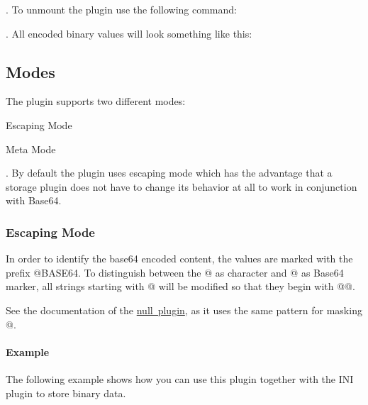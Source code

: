 . To unmount the plugin use the following command\+:


\begin{DoxyCode}{0}
\end{DoxyCode}


. All encoded binary values will look something like this\+:


\begin{DoxyCode}{0}
\end{DoxyCode}
\hypertarget{autotoc_md52_autotoc_md55}{}\subsection{Modes}\label{autotoc_md52_autotoc_md55}
The plugin supports two different modes\+:


\begin{DoxyEnumerate}
\item Escaping Mode
\item Meta Mode
\end{DoxyEnumerate}

. By default the plugin uses escaping mode which has the advantage that a storage plugin does not have to change its behavior at all to work in conjunction with Base64.\hypertarget{autotoc_md52_autotoc_md56}{}\subsubsection{Escaping Mode}\label{autotoc_md52_autotoc_md56}
In order to identify the base64 encoded content, the values are marked with the prefix {\ttfamily @B\+A\+S\+E64}. To distinguish between the {\ttfamily @} as character and {\ttfamily @} as Base64 marker, all strings starting with {\ttfamily @} will be modified so that they begin with {\ttfamily @@}.

See the documentation of the \mbox{\hyperlink{autotoc_md511_src_plugins_null_README_md}{null plugin}}, as it uses the same pattern for masking {\ttfamily @}.\hypertarget{autotoc_md52_autotoc_md57}{}\paragraph{Example}\label{autotoc_md52_autotoc_md57}
The following example shows how you can use this plugin together with the I\+NI plugin to store binary data.


